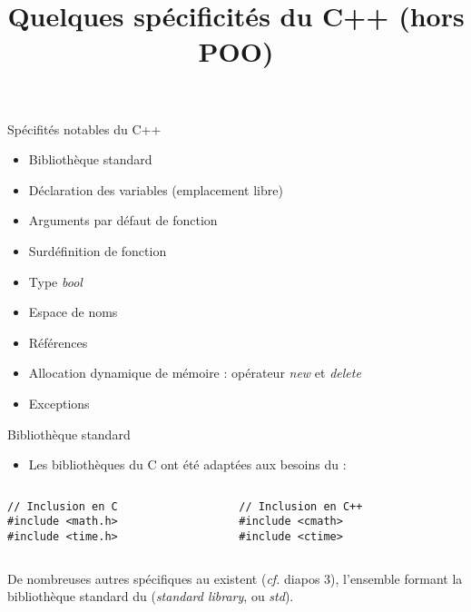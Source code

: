 \documentclass[c]{beamer}
\title{Quelques spécificités du C++ (hors POO)}
\begin{document}
\maketitle
\def\theFancyVerbLine{%
  \color{white}\sffamily\tiny\arabic{FancyVerbLine}%
        {\tikz[remember picture,overlay]\node(minted-\arabic{FancyVerbLine}){};}%
}


\begin{frame}[fragile]{Spécifités notables du C++}
  \begin{itemize}  
  \item Bibliothèque standard
  \item Déclaration des variables (emplacement libre)
  \item Arguments par défaut de fonction
  \item Surdéfinition de fonction
  \item Type \textit{bool}
  \item Espace de noms
  \item Références
  \item Allocation dynamique de mémoire : opérateur \textit{new} et \textit{delete}
  \item Exceptions
  \end{itemize}
\end{frame}


\begin{frame}[fragile]{Bibliothèque standard}
\begin{itemize}
\item Les bibliothèques du C ont été adaptées aux besoins du \Cpp :
\end{itemize}

\begin{columns}
\begin{column}{0.3\columnwidth}
\begin{verbatim}
// Inclusion en C
#include <math.h>
#include <time.h>
\end{verbatim}
\end{column}

\begin{column}{0.4\columnwidth}
\begin{verbatim}
// Inclusion en C++
#include <cmath>
#include <ctime>
\end{verbatim}
\end{column}
\end{columns}

\vspace{3em}
De nombreuses autres spécifiques au \Cpp existent (\textit{cf.} diapos 3), l'ensemble formant la bibliothèque standard du \Cpp (\textit{standard library}, ou \textit{std}).

\end{frame}
\end{document}
